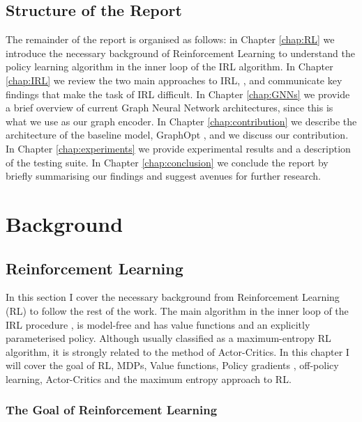 \documentclass{report}
\numberwithin{equation}{section}
\numberwithin{figure}{section}
\numberwithin{table}{section}
\numberwithin{algorithm}{section}
\begin{document}
\section*{Structure of the Report}\label{sec:structureOfReport}
The remainder of the report is organised as follows:
in Chapter \ref{chap:RL} we introduce the necessary background 
of Reinforcement Learning to understand the policy learning 
algorithm in the inner loop of the IRL algorithm. In Chapter 
\ref{chap:IRL} we review the two main approaches to IRL, 
\citep{NgIRL,Ziebart2008}, and communicate key findings that 
make the task of IRL difficult. In Chapter \ref{chap:GNNs} 
we provide a brief overview of current Graph Neural Network 
architectures, since this is what we use as our graph encoder.
In Chapter \ref{chap:contribution} we describe the architecture 
of the baseline model, GraphOpt \citep{GraphOpt}, and we 
discuss our contribution. In Chapter \ref{chap:experiments} we 
provide experimental results and a description of the testing 
suite. In Chapter \ref{chap:conclusion} we conclude the 
report by briefly summarising our findings and suggest avenues 
for further research.


\chapter{Background}\label{chap:Background}
\section{Reinforcement Learning}
\label{sec:RL}
In this section I cover the necessary background from Reinforcement 
Learning (RL) to follow the 
rest of the work. The main algorithm in the inner 
loop of the IRL procedure \citep{SAC2}, is model-free and has value 
functions and an explicitly parameterised policy. Although usually 
classified as a maximum-entropy RL algorithm, it is strongly related 
to the method of Actor-Critics. In this chapter I will cover 
the goal of RL, 
MDPs, Value functions, Policy gradients \citep{REINFORCE}, 
off-policy learning, Actor-Critics \citep{Tsitsiklis} and 
the maximum entropy approach to RL.

\subsection{The Goal of Reinforcement Learning}
\label{sec:RLGoal}
\end{document}
